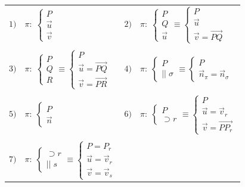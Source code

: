 \begin{table}[H]
\centering
\begin{tabular}{ll}
$1)\quad \pi:\; \begin{cases} P\\\vec u \\ \vec v \end{cases}$ 
 &
$2)\quad  \pi:\; \begin{cases} P\\Q\\ \vec u \end{cases}\equiv \begin{cases} P \\ \vec u \\ \vec v=\overrightarrow{PQ} \end{cases}$    
 \\ \\
$3)\quad \pi:\; \begin{cases} P\\Q\\R  \end{cases} \equiv \begin{cases} P\\ \vec u=\overrightarrow{PQ} \\ \vec v=\overrightarrow{PR}\end{cases}$ 
&  
$4)\quad  \pi:\; \begin{cases}  P\\ ||\;\sigma \end{cases}\equiv \begin{cases} P \\ \vec n_{\pi}=\vec n_{\sigma} \end{cases}$  
 \\ \\
$5)\quad  \pi:\; \begin{cases} P\\ \vec n \end{cases}$ 
 & 
$6)\quad  \pi:\; \begin{cases}  P \\ \supset r \end{cases} \equiv \begin{cases} P \\ \vec u=\vec v_r \\ \vec v=\overrightarrow{PP_r} \end{cases}$ 
 \\ \\
$7)\quad  \pi:\; \begin{cases} \supset r \\ ||\; s \end{cases} \equiv \begin{cases} P=P_r \\ \vec u=\vec v_r \\ \vec v=\vec v_{s} \end{cases}$ 

\end{tabular}
\end{table}
